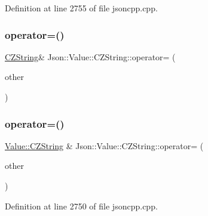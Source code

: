 Definition at line 2755 of file jsoncpp.\+cpp.

\hypertarget{class_json_1_1_value_1_1_c_z_string_aa810044a74c73d58153639a2affa013f}{}\label{class_json_1_1_value_1_1_c_z_string_aa810044a74c73d58153639a2affa013f} 
\subsubsection{\texorpdfstring{operator=()}{operator=()}\hspace{0.1cm}{\footnotesize\ttfamily [1/2]}}
{\footnotesize\ttfamily \hyperlink{class_json_1_1_value_1_1_c_z_string}{C\+Z\+String}\& Json\+::\+Value\+::\+C\+Z\+String\+::operator= (\begin{DoxyParamCaption}\item[{\hyperlink{class_json_1_1_value_1_1_c_z_string}{C\+Z\+String}}]{other }\end{DoxyParamCaption})}

\hypertarget{class_json_1_1_value_1_1_c_z_string_a6513ff431b0593d5744868dfee739f7b}{}\label{class_json_1_1_value_1_1_c_z_string_a6513ff431b0593d5744868dfee739f7b} 
\subsubsection{\texorpdfstring{operator=()}{operator=()}\hspace{0.1cm}{\footnotesize\ttfamily [2/2]}}
{\footnotesize\ttfamily \hyperlink{class_json_1_1_value_1_1_c_z_string}{Value\+::\+C\+Z\+String} \& Json\+::\+Value\+::\+C\+Z\+String\+::operator= (\begin{DoxyParamCaption}\item[{\hyperlink{class_json_1_1_value_1_1_c_z_string}{C\+Z\+String}}]{other }\end{DoxyParamCaption})}



Definition at line 2750 of file jsoncpp.\+cpp.

\hypertarget{class_json_1_1_value_1_1_c_z_string_ad41766c98fc6a6d5fcd72aaf78fc5db0}{}\label{class_json_1_1_value_1_1_c_z_string_ad41766c98fc6a6d5fcd72aaf78fc5db0} 
